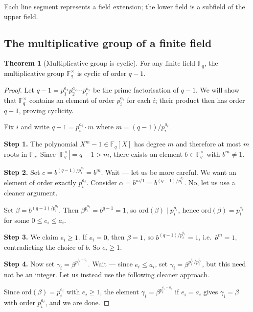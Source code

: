 \documentclass[12pt,a4paper,openany]{book}
\theoremstyle{definition}
\newtheorem{theorem}{Theorem}[chapter]
\theoremstyle{remark}
\newcommand{\F}{\mathbb{F}}
\begin{document}
Each line segment represents a field extension; the lower field is a
subfield of the upper field.

\subsection{The multiplicative group of a finite field}
\label{subsec:mult-group-cyclic}

\begin{theorem}[Multiplicative group is cyclic]
\label{thm:finite-field-mult-cyclic}
For any finite field $\F_q$, the multiplicative group $\F_q^{\times}$
is cyclic of order $q - 1$.
\end{theorem}

\begin{proof}
Let $q - 1 = p_1^{a_1} p_2^{a_2} \cdots p_r^{a_r}$ be the prime
factorisation of $q - 1$. We will show that $\F_q^{\times}$ contains
an element of order $p_i^{a_i}$ for each $i$; their product then has
order $q - 1$, proving cyclicity.

Fix $i$ and write $q - 1 = p_i^{a_i} \cdot m$ where
$m = (q-1)/p_i^{a_i}$.

\textbf{Step 1.} The polynomial $X^m - 1 \in \F_q[X]$ has degree $m$
and therefore at most $m$ roots in $\F_q$. Since
$|\F_q^{\times}| = q - 1 > m$, there exists an element
$b \in \F_q^{\times}$ with $b^m \ne 1$.

\textbf{Step 2.} Set $c = b^{(q-1)/p_i^{a_i}} = b^m$. Wait ---
let us be more careful. We want an element of order exactly
$p_i^{a_i}$. Consider $\alpha = b^{m/1} = b^{(q-1)/p_i^{a_i}}$.
No, let us use a cleaner argument.

Set $\beta = b^{(q-1)/p_i^{a_i}}$. Then
$\beta^{p_i^{a_i}} = b^{q-1} = 1$, so $\mathrm{ord}(\beta) \mid
p_i^{a_i}$, hence $\mathrm{ord}(\beta) = p_i^{e_i}$ for some
$0 \le e_i \le a_i$.

\textbf{Step 3.} We claim $e_i \ge 1$. If $e_i = 0$, then
$\beta = 1$, so $b^{(q-1)/p_i^{a_i}} = 1$, i.e.\ $b^m = 1$,
contradicting the choice of $b$. So $e_i \ge 1$.

\textbf{Step 4.} Now set $\gamma_i = \beta^{p_i^{e_i - a_i}}$. Wait
--- since $e_i \le a_i$, set
$\gamma_i = \beta^{p_i^{e_i}/p_i^{a_i}}$, but this need not be an
integer. Let us instead use the following cleaner approach.

Since $\mathrm{ord}(\beta) = p_i^{e_i}$ with $e_i \ge 1$, the
element $\gamma_i = \beta^{p_i^{e_i - a_i}}$ if $e_i = a_i$ gives
$\gamma_i = \beta$ with order $p_i^{a_i}$, and we are done.


\end{proof}
\end{document}
